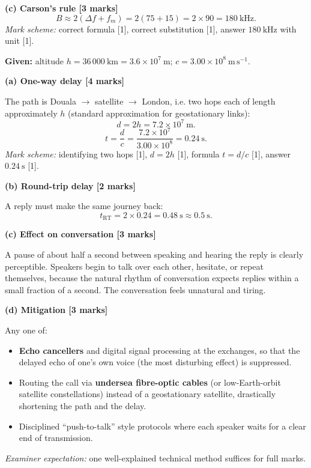 \documentclass[11pt]{article}
\begin{document}
\begin{corrige}
\textbf{(c) Carson's rule [3 marks]}
\[ B \approx 2(\Delta f + f_m) = 2(75 + 15) = 2 \times 90 = 180\ \mathrm{kHz}. \]
\emph{Mark scheme:} correct formula [1], correct substitution [1], answer $180\ \mathrm{kHz}$ with unit [1].
\end{corrige}

\begin{corrige}
\textbf{Given:} altitude $h = 36\,000\ \mathrm{km} = 3.6\times 10^{7}\ \mathrm{m}$; $c = 3.00\times 10^{8}\ \mathrm{m\,s^{-1}}$.

\textbf{(a) One-way delay [4 marks]}

The path is Douala $\to$ satellite $\to$ London, i.e. two hops each of length approximately $h$ (standard approximation for geostationary links):
\[ d = 2h = 7.2\times 10^{7}\ \mathrm{m}. \]
\[ t = \frac{d}{c} = \frac{7.2\times 10^{7}}{3.00\times 10^{8}} = 0.24\ \mathrm{s}. \]
\emph{Mark scheme:} identifying two hops [1], $d = 2h$ [1], formula $t = d/c$ [1], answer $0.24\ \mathrm{s}$ [1].

\textbf{(b) Round-trip delay [2 marks]}

A reply must make the same journey back:
\[ t_{\text{RT}} = 2 \times 0.24 = 0.48\ \mathrm{s} \approx 0.5\ \mathrm{s}. \]

\textbf{(c) Effect on conversation [3 marks]}

A pause of about half a second between speaking and hearing the reply is clearly perceptible. Speakers begin to talk over each other, hesitate, or repeat themselves, because the natural rhythm of conversation expects replies within a small fraction of a second. The conversation feels unnatural and tiring.

\textbf{(d) Mitigation [3 marks]}

Any one of:
\begin{itemize}
\item \textbf{Echo cancellers} and digital signal processing at the exchanges, so that the delayed echo of one's own voice (the most disturbing effect) is suppressed.
\item Routing the call via \textbf{undersea fibre-optic cables} (or low-Earth-orbit satellite constellations) instead of a geostationary satellite, drastically shortening the path and the delay.
\item Disciplined ``push-to-talk'' style protocols where each speaker waits for a clear end of transmission.
\end{itemize}
\emph{Examiner expectation:} one well-explained technical method suffices for full marks.
\end{corrige}
\end{document}
